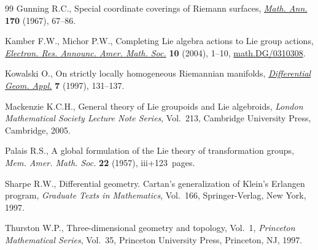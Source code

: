 \documentclass[pdftex]{sigma}
\numberwithin{equation}{section}
\begin{document}
\begin{thebibliography}{99}
Gunning R.C., Special coordinate coverings of {R}iemann surfaces, \href{http://dx.doi.org/10.1007/BF01362287}{\textit{Math.
  Ann.}} \textbf{170} (1967), 67--86.

Kamber F.W., Michor P.W., Completing {L}ie algebra actions to {L}ie group
  actions, \href{http://dx.doi.org/10.1090/S1079-6762-04-00124-6}{\textit{Electron. Res. Announc. Amer. Math. Soc.}} \textbf{10}
  (2004), 1--10, \href{http://arxiv.org/abs/math.DG/0310308}{math.DG/0310308}.

Kowalski O., On strictly locally homogeneous {R}iemannian manifolds,
  \href{http://dx.doi.org/10.1016/S0926-2245(96)00043-5}{\textit{Differential Geom. Appl.}} \textbf{7} (1997), 131--137.

Mackenzie K.C.H., General theory of {L}ie groupoids and {L}ie algebroids,
  \textit{London Mathematical Society Lecture Note Series}, Vol.~213, Cambridge
  University Press, Cambridge, 2005.

Palais R.S., A global formulation of the {L}ie theory of transformation groups,
  \textit{Mem. Amer. Math. Soc.} \textbf{22} (1957), iii+123~pages.

Sharpe R.W., Dif\/ferential geometry. Cartan's generalization of Klein's Erlangen
  program, \textit{Graduate Texts in Mathematics}, Vol.~166, Springer-Verlag,
  New York, 1997.

Thurston W.P., Three-dimensional geometry and topology, {V}ol.~1,
  \textit{Princeton Mathematical Series}, Vol.~35, Princeton University Press,
  Princeton, NJ, 1997.

\end{thebibliography}\LastPageEnding
\end{document}

